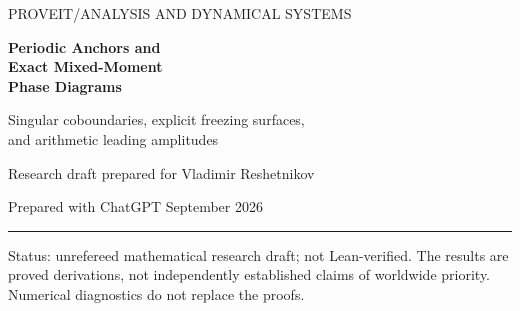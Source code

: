 \documentclass[11pt,a4paper]{article}
\numberwithin{equation}{section}
\theoremstyle{definition}
\theoremstyle{remark}
\newcommand{\cO}{\mathcal O}
\newcommand{\PP}{\mathcal P}
\begin{document}
\hypersetup{pageanchor=false}
\begin{titlepage}
\thispagestyle{empty}\setlength{\parindent}{0pt}
{\small\sffamily\color{ink} PROVEIT\quad /\quad ANALYSIS AND DYNAMICAL SYSTEMS}\par
\vspace{12mm}
{\Huge\bfseries\color{ink} Periodic Anchors and\\[3mm]
Exact Mixed-Moment\\[3mm] Phase Diagrams\par}
\vspace{7mm}
{\Large Singular coboundaries, explicit freezing surfaces,\\[2mm]
and arithmetic leading amplitudes\par}
\vspace{8mm}
{\large Research draft prepared for Vladimir Reshetnikov\par}
{Prepared with ChatGPT\quad\textbullet{} September 2026\par}
\vspace{5mm}\hrule\vspace{3mm}
\begin{abstract}
We identify a globally solvable class of genuinely mixed digital products.
For the map $T_bx=bx\pmod1$, place phase shifts on finitely many complete
periodic orbits $\cO_i$, with a common positive exponent $a_i$ on each orbit.
The product of normalized digital masks is a singular coboundary.
It changes the energy of every invariant measure avoiding the selected
orbits by the same amount, but gives each selected orbit an explicit
additional reward. For an arbitrary continuous nonnegative background
weight $v$ of finite pressure, we prove
\[
 \PP_b\!\left(v\prod_i\prod_{p\in\cO_i}m_b(\cdot-p)^{a_i}\right)
 =-D\log b+\max\left\{\PP_b(v),\ \max_i(Q_i(v)+a_i\log b)\right\},
\]
where $D=\sum_i a_i|\cO_i|$ and $Q_i(v)$ is the orbit average of $\log v$.
For a squared shifted digital background, Parseval gives $\PP_b(v)=0$
at every phase. A subharmonic sampling estimate converts this formula
into explicit mixed-moment growth exponents for arbitrary positive real
anchor exponents. Without a background we also determine leading
constants, logarithmic critical terms, and uniform critical windows.
An exactly evaluated seventh-root example has leading amplitudes $3,4,4$
according to the depth modulo three. We construct prescribed finite
polyhedral pressure diagrams and extend orbit selection to nonlinear
expanding circle maps. Full proofs, exact-arithmetic checks, numerical
diagnostics, and a research agenda are included.
\end{abstract}
\vfill
{\small\color{muted} Status: unrefereed mathematical research draft; not Lean-verified.
The results are proved derivations, not independently established claims
of worldwide priority. Numerical diagnostics do not replace the proofs.}
\end{titlepage}
\hypersetup{pageanchor=true}
\begingroup\small\setlength{\parskip}{0pt}\tableofcontents\endgroup
\newpage
\end{document}
